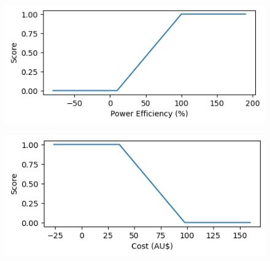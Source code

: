 \documentclass{article}
\begin{document}
\begin{figure}[H]
\center
\includegraphics[scale=0.7]{tpm5}
\end{figure}
\begin{figure}[H]
\center
\includegraphics[scale=0.7]{tpm6}
\end{figure}
\end{document}
